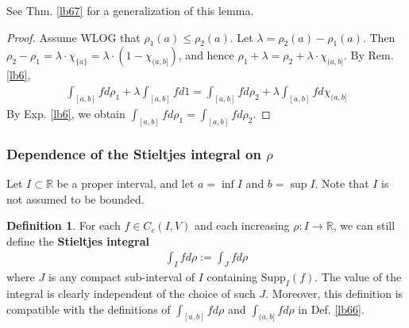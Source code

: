 \documentclass[12pt,b5paper,notitlepage]{article}
\theoremstyle{definition}
\newtheorem{df}{Definition}[section]
\newtheorem{rem}[df]{Remark}
\theoremstyle{plain}
\newcommand{\Rbb}{\mathbb R}
\newcommand{\Supp}{\mathrm{Supp}}
\numberwithin{equation}{section}
\begin{document}
See Thm. \ref{lb67} for a generalization of this lemma.

\begin{proof}
Assume WLOG that $\rho_1(a)\leq\rho_2(a)$. Let $\lambda=\rho_2(a)-\rho_1(a)$. Then $\rho_2-\rho_1=\lambda\cdot\chi_{\{a\}}=\lambda\cdot (1-\chi_{(a,b]})$, and hence $\rho_1+\lambda=\rho_2+\lambda\cdot\chi_{(a,b]}$. By Rem. \ref{lb6},
\begin{align*}
\int_{[a,b]}fd\rho_1+\lambda\int_{[a,b]} fd1=\int_{[a,b]}fd\rho_2+\lambda\int_{[a,b]} fd\chi_{(a,b]}
\end{align*}
By Exp. \ref{lb6}, we obtain $\int_{[a,b]}fd\rho_1=\int_{[a,b]}fd\rho_2$.
\end{proof}



\begin{comment}
\begin{rem}
The Stieltjes integral can be defined on unbounded intervals. For example, if $\rho:[a,+\infty)\rightarrow\Rbb$ is \textit{bounded} and increasing, for $f\in C_0([a,+\infty),V)$, we define
\begin{align*}
\int_{[a,+\infty)} fd\rho=\lim_{\lambda\rightarrow+\infty}\int_{[a,\lambda]} fd\rho
\end{align*}
where the RHS converges. Similarly, we can define $\int_{-\infty}^{+\infty}fd\rho$ for bounded increasing $\rho:\Rbb\rightarrow\Rbb$ and $f\in C_0(\Rbb,V)$.
\end{rem}
\end{comment}





\subsubsection{Dependence of the Stieltjes integral on $\rho$}


Let $I\subset\Rbb$ be a proper interval, and let $a=\inf I$ and $b=\sup I$. Note that $I$ is not assumed to be bounded. 

\begin{df}
For each $f\in C_c(I,V)$ and each increasing $\rho:I\rightarrow\Rbb$, we can still define the \textbf{Stieltjes integral} 
\begin{align*}
\int_I fd\rho:=\int_Jfd\rho
\end{align*}
where $J$ is any compact sub-interval of $I$ containing $\Supp_I(f)$. The value of the integral is clearly independent of the choice of such $J$. Moreover, this definition is compatible with the definitions of $\int_{[a,b]}fd\rho$ and $\int_{(a,b]}fd\rho$ in Def. \ref{lb66}.
\end{df}
\end{document}
